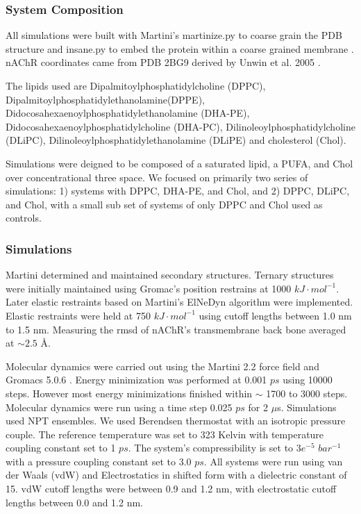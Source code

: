 \subsubsection{System Composition}

All simulations were built with Martini's martinize.py to coarse grain the PDB structure and insane.py to embed the protein within a coarse grained membrane \cite{martini}. nAChR coordinates came from PDB 2BG9 derived by Unwin et al. 2005 \cite{Unwin_Refined_2005}. 

The lipids used are Dipalmitoylphosphatidylcholine (DPPC), Dipalmitoylphosphatidylethanolamine(DPPE), Didocosahexaenoylphosphatidylethanolamine (DHA-PE), Didocosahexaenoylphosphatidylcholine (DHA-PC), Dilinoleoylphosphatidylcholine (DLiPC), Dilinoleoylphosphatidylethanolamine (DLiPE) and cholesterol (Chol).

Simulations were deigned to be composed of a saturated lipid, a PUFA, and Chol over concentrational three space. We focused on primarily two series of simulations: 1) systems with DPPC, DHA-PE, and Chol, and 2) DPPC, DLiPC, and Chol, with a small sub set of systems of only DPPC and Chol  used as controls. 

\subsubsection{Simulations}

Martini determined and maintained secondary structures. Ternary structures were initially maintained using Gromac's \cite{grom} position restrains at 1000 $kJ\cdot mol^{-1}$. Later elastic restraints based on Martini's \cite{martini} ElNeDyn algorithm \cite{Periole_Combining_2009} were implemented. Elastic restraints were held at 750 $kJ\cdot mol^{-1}$ using cutoff lengths between 1.0 nm to 1.5 nm. Measuring the rmsd of nAChR's transmembrane back bone averaged at $\sim 2.5$ \r{A}.  


Molecular dynamics were carried out using the Martini 2.2 force field \cite{martini} and Gromacs 5.0.6 \cite{grom}. Energy minimization was performed at 0.001 $ps$ using 10000 steps. However most energy minimizations finished within $\sim$ 1700 to 3000 steps. Molecular dynamics were run using a time step 0.025 $ps$ for 2 $\mu$s. Simulations used  NPT ensembles. We used Berendsen thermostat with an isotropic pressure couple. The reference temperature was set to 323 Kelvin with temperature coupling constant set to  1 $ps$. The system's compressibility is set to $3e^{-5}$ $bar^{-1}$ with a pressure coupling constant set to 3.0 $ps$. All systems were run using van der Waals (vdW) and Electrostatics in shifted form with a dielectric constant of 15. vdW cutoff lengths were between 0.9 and 1.2 nm, with electrostatic cutoff lengths between 0.0 and 1.2 nm.

